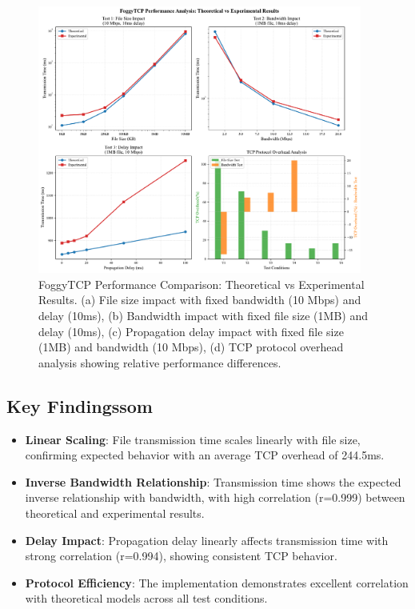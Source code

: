 \documentclass[11pt,letterpaper]{article}
\begin{document}
\begin{figure}[H]
    \centering
    \includegraphics[width=0.95\textwidth]{foggytcp_performance_analysis.pdf}
    \caption{FoggyTCP Performance Comparison: Theoretical vs Experimental Results. 
    (a) File size impact with fixed bandwidth (10 Mbps) and delay (10ms), 
    (b) Bandwidth impact with fixed file size (1MB) and delay (10ms), 
    (c) Propagation delay impact with fixed file size (1MB) and bandwidth (10 Mbps), 
    (d) TCP protocol overhead analysis showing relative performance differences.}
    \label{fig:foggytcp_analysis}
\end{figure}

\subsection{Key Findingssom}

\begin{itemize}
    \item \textbf{Linear Scaling}: File transmission time scales linearly with file size, confirming expected behavior with an average TCP overhead of 244.5ms.
    
    \item \textbf{Inverse Bandwidth Relationship}: Transmission time shows the expected inverse relationship with bandwidth, with high correlation (r=0.999) between theoretical and experimental results.
    
    \item \textbf{Delay Impact}: Propagation delay linearly affects transmission time with strong correlation (r=0.994), showing consistent TCP behavior.
    
    \item \textbf{Protocol Efficiency}: The implementation demonstrates excellent correlation with theoretical models across all test conditions.
\end{itemize}
\end{document}
